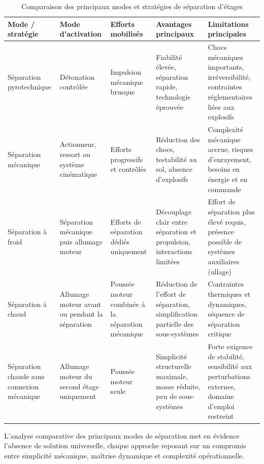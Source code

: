 \begin{table}[h!]
\centering
\renewcommand{\arraystretch}{1.3}
\begin{tabular}{|p{2cm}|p{2.25cm}|p{2.25cm}|p{3.5cm}|p{3.5cm}|}
\hline
\textbf{Mode / \newline stratégie} &
\textbf{Mode d’activation} &
\textbf{Efforts mobilisés} &
\textbf{Avantages principaux} &
\textbf{Limitations principales} \\
\hline

Séparation pyrotechnique &
Détonation contrôlée &
Impulsion mécanique brusque &
Fiabilité élevée, séparation rapide, technologie éprouvée &
Chocs mécaniques importants, irréversibilité, contraintes réglementaires liées aux explosifs \\
\hline

Séparation mécanique &
Actionneur, ressort ou système cinématique &
Efforts progressifs et contrôlés &
Réduction des chocs, testabilité au sol, absence d’explosifs &
Complexité mécanique accrue, risques d’enrayement, besoins en énergie et en commande \\
\hline

Séparation à froid &
Séparation mécanique puis allumage moteur &
Efforts de séparation dédiés uniquement &
Découplage clair entre séparation et propulsion, interactions limitées &
Effort de séparation plus élevé requis, présence possible de systèmes auxiliaires (ullage) \\
\hline

Séparation à chaud &
Allumage moteur avant ou pendant la séparation &
Poussée moteur combinée à la séparation mécanique &
Réduction de l’effort de séparation, simplification partielle des sous-systèmes &
Contraintes thermiques et dynamiques, séquence de séparation critique \\
\hline

Séparation chaude sans connexion mécanique &
Allumage moteur du second étage uniquement &
Poussée moteur seule &
Simplicité structurelle maximale, masse réduite, peu de sous-systèmes &
Forte exigence de stabilité, sensibilité aux perturbations externes, domaine d’emploi restreint \\
\hline

\end{tabular}
\caption{Comparaison des principaux modes et stratégies de séparation d’étages}
\label{tab:separation_modes}
\end{table}

L’analyse comparative des principaux modes de séparation met en évidence l’absence de solution universelle, chaque approche
reposant sur un compromis entre simplicité mécanique, maîtrise dynamique et complexité opérationnelle.\\

